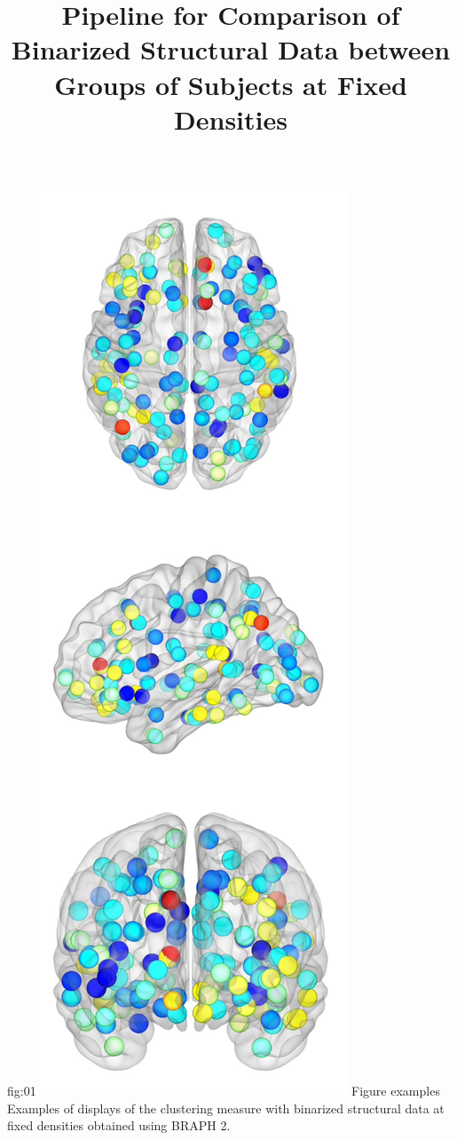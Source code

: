 \documentclass[justified]{tufte-handout}
\title{Pipeline for Comparison of Binarized Structural Data between Groups of Subjects at Fixed Densities}
\begin{document}
\maketitle

	{fig:01}
	{\includegraphics{fig01.png}}
	{Figure examples}
	{
	Examples of displays of the clustering measure with binarized structural data at fixed densities obtained using BRAPH 2.
	}
 
\end{document}
